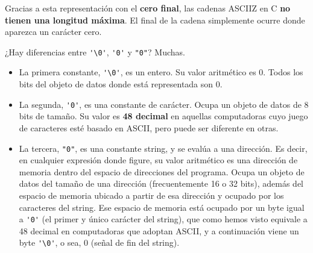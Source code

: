 Gracias a esta representación con el \textbf{cero final}, las cadenas ASCIIZ en C \textbf{no tienen una longitud máxima}. El final de la cadena simplemente ocurre donde aparezca un carácter cero.


¿Hay diferencias entre \lstinline{'\0'}, \lstinline{'0'} y \lstinline{"0"}? Muchas.

\begin{itemize}
	\item La primera constante, \lstinline{'\0'}, es un entero. Su valor aritmético es 0. Todos los bits del objeto de datos donde está representada son 0.
	\item La segunda, \lstinline{'0'}, es una constante de carácter. Ocupa un objeto de datos de 8 bits de tamaño. Su valor es \textbf{48 decimal} en aquellas computadoras cuyo juego de caracteres esté basado en ASCII, pero puede ser diferente en otras. 
	\item La tercera, \lstinline{"0"}, es una constante string, y se evalúa a una dirección. Es decir, en cualquier expresión donde figure, su valor aritmético es una dirección de memoria dentro del espacio de direcciones del programa. Ocupa un objeto de datos del
tamaño de una dirección (frecuentemente 16 o 32 bits), además del espacio de memoria ubicado a partir de esa dirección y ocupado por los caracteres del string. Ese espacio de memoria está ocupado por un byte igual a \lstinline{'0'} (el primer y único carácter del string), que como hemos visto equivale a 48 decimal en computadoras que adoptan ASCII, y a continuación viene un byte \lstinline{'\0'}, o sea, 0 (señal de fin del string).
\end{itemize}

